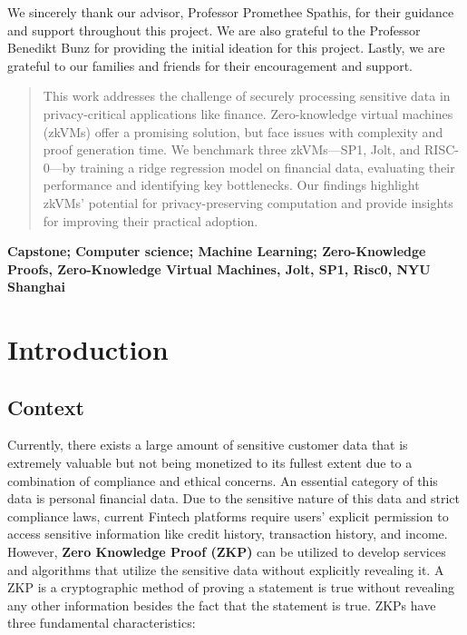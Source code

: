\documentclass{scrartcl}
\begin{document}
\vspace{1cm}

\begin{acknowledgements}
We sincerely thank our advisor, Professor Promethee Spathis, for their guidance and support throughout this project. We are also grateful to the Professor Benedikt Bunz for providing the initial ideation for this project. Lastly, we are grateful to our families and friends for their encouragement and support.\end{acknowledgements}

\newpage

\begin{abstract}
This work addresses the challenge of securely processing sensitive data in privacy-critical applications like finance. Zero-knowledge virtual machines (zkVMs) offer a promising solution, but face issues with complexity and proof generation time. We benchmark three zkVMs—SP1, Jolt, and RISC-0—by training a ridge regression model on financial data, evaluating their performance and identifying key bottlenecks. Our findings highlight zkVMs’ potential for privacy-preserving computation and provide insights for improving their practical adoption.
\end{abstract}
\vspace{1cm}

\begin{keywords}
\centering
         \textbf{Capstone; Computer science; Machine Learning; Zero-Knowledge Proofs, Zero-Knowledge Virtual Machines, Jolt, SP1, Risc0, NYU Shanghai}
\end{keywords}

\newpage



\doublespacing
\tableofcontents
\singlespacing

\newpage

\doublespacing

\section{Introduction}

\subsection{Context}

Currently, there exists a large amount of sensitive customer data that is extremely valuable but not being monetized to its fullest extent due to a combination of compliance and ethical concerns. An essential category of this data is personal financial data. Due to the sensitive nature of this data and strict compliance laws, current Fintech platforms require users’ explicit permission to access sensitive information like credit history, transaction history, and income. However, \textbf{Zero Knowledge Proof (ZKP)} can be utilized to develop services and algorithms that utilize the sensitive data without explicitly revealing it. A ZKP is a cryptographic method of proving a statement is true without revealing any other information besides the fact that the statement is true. ZKPs have three fundamental characteristics:
\end{document}
